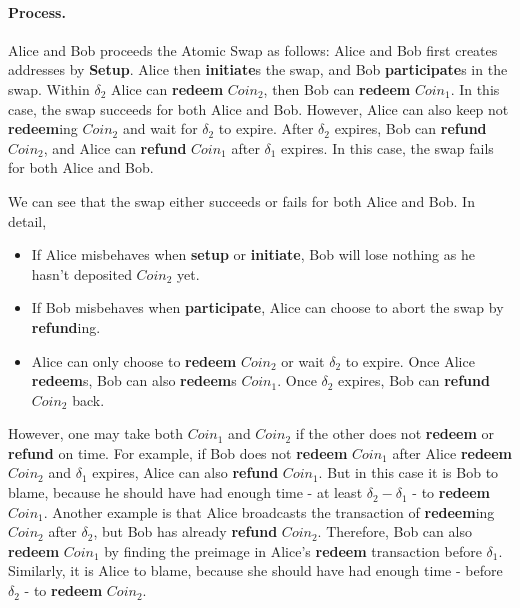 \paragraph{Process.}
Alice and Bob proceeds the Atomic Swap as follows:
Alice and Bob first creates addresses by \textbf{Setup}.
Alice then \textbf{initiate}s the swap, and Bob \textbf{participate}s in the swap.
Within $\delta_2$ Alice can \textbf{redeem} $Coin_2$, then Bob can \textbf{redeem} $Coin_1$.
In this case, the swap succeeds for both Alice and Bob.
However, Alice can also keep not \textbf{redeem}ing $Coin_2$ and wait for $\delta_2$ to expire.
After $\delta_2$ expires, Bob can \textbf{refund} $Coin_2$, and Alice can \textbf{refund} $Coin_1$ after $\delta_1$ expires.
In this case, the swap fails for both Alice and Bob.

We can see that the swap either succeeds or fails for both Alice and Bob.
In detail,

\begin{itemize}
    \item If Alice misbehaves when \textbf{setup} or \textbf{initiate}, Bob will lose nothing as he hasn't deposited $Coin_2$ yet.
    \item If Bob misbehaves when \textbf{participate}, Alice can choose to abort the swap by \textbf{refund}ing.
    \item Alice can only choose to \textbf{redeem} $Coin_2$ or wait $\delta_2$ to expire.
    Once Alice \textbf{redeem}s, Bob can also \textbf{redeem}s $Coin_1$.
    Once $\delta_2$ expires, Bob can \textbf{refund} $Coin_2$ back.
\end{itemize}

However, one may take both $Coin_1$ and $Coin_2$ if the other does not \textbf{redeem} or \textbf{refund} on time.
For example, if Bob does not \textbf{redeem} $Coin_1$ after Alice \textbf{redeem} $Coin_2$ and $\delta_1$ expires, Alice can also \textbf{refund} $Coin_1$.
But in this case it is Bob to blame, because he should have had enough time - at least $\delta_2 - \delta_1$  - to \textbf{redeem} $Coin_1$.
Another example is that Alice broadcasts the transaction of \textbf{redeem}ing $Coin_2$ after $\delta_2$, but Bob has already \textbf{refund} $Coin_2$.
Therefore, Bob can also \textbf{redeem} $Coin_1$ by finding the preimage in Alice's \textbf{redeem} transaction before $\delta_1$.
Similarly, it is Alice to blame, because she should have had enough time - before $\delta_2$ - to \textbf{redeem} $Coin_2$.

